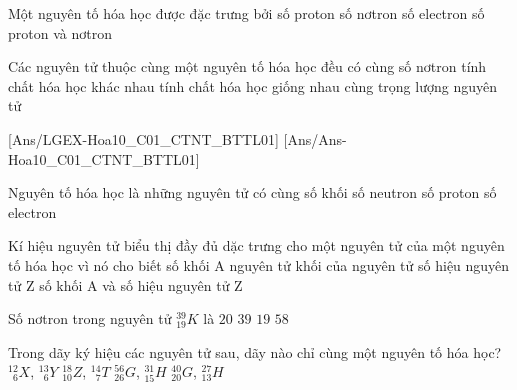 \hienthiloigiaivd
\begin{vd}
	Một nguyên tố hóa học được đặc trưng bởi
	\choice
	{\True số proton}
	{số nơtron}
	{số electron}
	{số proton và nơtron}
\end{vd}

\begin{vd}
	Các nguyên tử thuộc cùng một nguyên tố hóa học đều có
	\choice
	{cùng số nơtron}
	{tính chất hóa học khác nhau}
	{\True tính chất hóa học giống nhau}
	{cùng trọng lượng nguyên tử}
\end{vd}
[Ans/LGEX-Hoa10_C01_CTNT_BTTL01]
[Ans/Ans-Hoa10_C01_CTNT_BTTL01]
\luuloigiaiex
\begin{ex}
	Nguyên tố hóa học là những nguyên tử có cùng
	\choice
	{số khối}
	{số neutron}
	{\True số proton}
	{số electron}
\end{ex}
\begin{ex}
	Kí hiệu nguyên tử biểu thị đầy đủ dặc trưng cho một nguyên tử của một nguyên tố hóa học vì nó cho biết
	\choice
	{số khối A}
	{nguyên tử khối của nguyên tử}
	{số hiệu nguyên tử Z}
	{\True số khối A và số hiệu nguyên tử Z}
\end{ex}
\begin{ex}
	Số nơtron trong nguyên tử ${}^{39}_{19}K$ là
	\choice
	{\True$20$}
	{$39$}
	{$19$}
	{$58$}
\end{ex}
\begin{ex}
	Trong dãy ký hiệu các nguyên tử sau, dãy nào chỉ cùng một nguyên tố hóa học?
	\choice
	{\True ${}^{12}_{\phantom{0}6}X$, ${}^{13}_{\phantom{0}6}Y$}
	{${}^{18}_{10}Z$, ${}^{14}_{\phantom{0}7}T$}
	{${}^{56}_{26}G$, ${}^{31}_{15}H$}
	{${}^{40}_{20}G$, ${}^{27}_{13}H$}
\end{ex}
